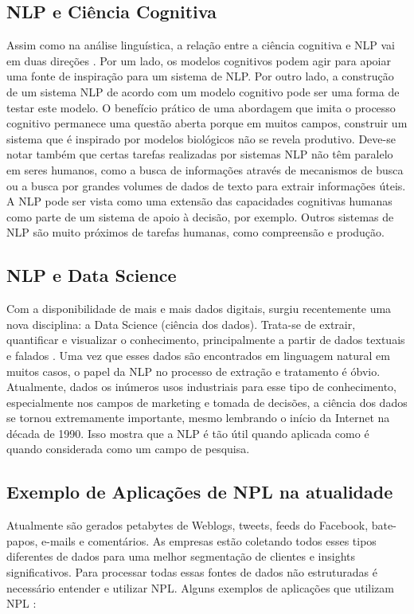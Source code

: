 \documentclass[
	12pt,				%
	openright,			%
	oneside,			%
	a4paper,			%
	english,			%
	spanish,			%
	brazil				%
	]{abntex2}
\begin{document}
	\subsection*{NLP e Ciência Cognitiva}
	Assim como na análise linguística, a relação entre a ciência cognitiva e NLP vai em duas direções \cite{book_natural_lang}. Por um lado, os modelos cognitivos podem agir para apoiar uma fonte de inspiração para um sistema de NLP. Por outro lado, a construção de um sistema NLP de acordo com um modelo cognitivo pode ser uma forma de testar este modelo. O benefício prático de uma abordagem que imita o processo cognitivo permanece uma questão aberta porque em muitos campos, construir um sistema que é inspirado por modelos biológicos não se revela produtivo. Deve-se notar também que certas tarefas realizadas por sistemas NLP não têm paralelo em seres humanos, como a busca de informações através de mecanismos de busca ou a busca por grandes volumes de dados de texto para extrair informações úteis. A NLP pode ser vista como uma extensão das capacidades cognitivas humanas como parte de um sistema de apoio à decisão, por exemplo. Outros sistemas de NLP são muito próximos de tarefas humanas, como compreensão e produção.
	
	\subsection*{NLP e Data Science}	
	Com a disponibilidade de mais e mais dados digitais, surgiu recentemente uma nova disciplina: a Data Science (ciência dos dados). Trata-se de extrair, quantificar e visualizar o conhecimento, principalmente a partir de dados textuais e falados \cite{book_natural_lang}. Uma vez que esses dados são encontrados em linguagem natural em muitos casos, o papel da NLP no processo de extração e tratamento é óbvio. Atualmente, dados os inúmeros usos industriais para esse tipo de conhecimento, especialmente nos campos de marketing e tomada de decisões, a ciência dos dados se tornou extremamente importante, mesmo lembrando o início da Internet na década de 1990. Isso mostra que a NLP é tão útil quando aplicada como é quando considerada como um campo de pesquisa.

	\subsection*{Exemplo de Aplicações de NPL na atualidade}
	Atualmente são gerados petabytes de Weblogs, tweets, feeds do Facebook, bate-papos, e-mails e comentários. As empresas estão coletando todos esses tipos diferentes de dados para uma melhor segmentação de clientes e insights significativos. Para processar todas essas fontes de dados não estruturadas é necessário entender e utilizar NPL.
Alguns exemplos de aplicações que utilizam NPL \cite{book_natlang_python}:
\end{document}
